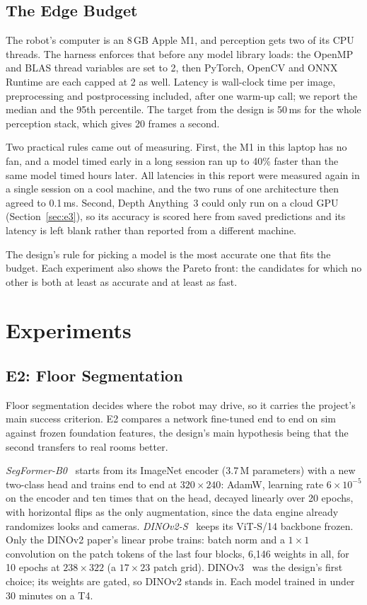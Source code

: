 \documentclass[conference]{IEEEtran}
\begin{document}
\subsection{The Edge Budget}

The robot's computer is an 8\,GB Apple M1, and perception gets two of its CPU
threads. The harness enforces that before any model library loads: the
OpenMP and BLAS thread variables are set to 2, then PyTorch, OpenCV and ONNX
Runtime are each capped at 2 as well. Latency is wall-clock time per image,
preprocessing and postprocessing included, after one warm-up call; we report
the median and the 95th percentile. The target from the design is 50\,ms for
the whole perception stack, which gives 20 frames a second.

Two practical rules came out of measuring. First, the M1 in this laptop has no
fan, and a model timed early in a long session ran up to 40\% faster than the
same model timed hours later. All latencies in this report were measured
again in a single session on a cool machine, and the two runs of one
architecture then agreed to 0.1\,ms. Second, Depth Anything~3 could only run
on a cloud GPU (Section~\ref{sec:e3}), so its accuracy is scored here from
saved predictions and its latency is left blank rather than reported from a
different machine.

The design's rule for picking a model is the most accurate one that fits the
budget. Each experiment also shows the Pareto front: the candidates for which
no other is both at least as accurate and at least as fast.

\section{Experiments}

\subsection{E2: Floor Segmentation}
\label{sec:e2}

Floor segmentation decides where the robot may drive, so it carries the
project's main success criterion. E2 compares a network fine-tuned end to end
on sim against frozen foundation features, the design's main hypothesis being
that the second transfers to real rooms better.

\emph{SegFormer-B0}~\cite{xie2021segformer} starts from its ImageNet encoder
(3.7\,M parameters) with a new two-class head and trains end to end at
$320\times240$: AdamW, learning rate $6\times10^{-5}$ on the encoder and ten
times that on the head, decayed linearly over 20 epochs, with horizontal flips
as the only augmentation, since the data engine already randomizes looks and
cameras. \emph{DINOv2-S}~\cite{oquab2023dinov2} keeps its ViT-S/14 backbone
frozen. Only the DINOv2 paper's linear probe trains: batch norm and a
$1\times1$ convolution on the patch tokens of the last four blocks, 6{,}146
weights in all, for 10 epochs at $238\times322$ (a $17\times23$ patch grid).
DINOv3~\cite{simeoni2025dinov3} was the design's first choice; its weights
are gated, so DINOv2 stands in. Each model trained in under 30 minutes on a
T4.
\end{document}
